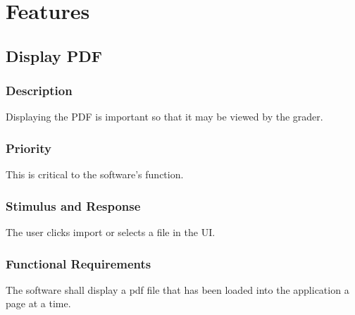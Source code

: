 \section{Features}


\subsection{Display PDF}
\subsubsection{Description}
Displaying the PDF is important so that it may be viewed by the grader.

\subsubsection{Priority}
This is critical to the software's function.

\subsubsection{Stimulus and Response}
The user clicks import or selects a file in the UI.

\subsubsection{Functional Requirements}
The software shall display a pdf file that has been loaded into the application a page at a time.


